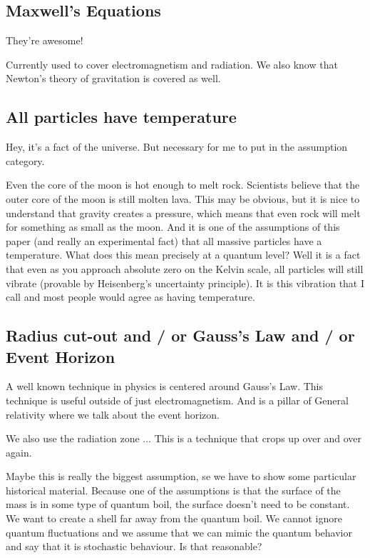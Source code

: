 \documentclass {article}
\begin{document}
\subsection{Maxwell’s Equations}

They’re awesome!

Currently used to cover electromagnetism and radiation. We also know that Newton's theory of gravitation is covered as well.


\subsection{All particles have temperature}

Hey, it’s a fact of the universe. But necessary for me to put in the assumption category. 

Even the core of the moon is hot enough to melt rock. Scientists believe that the outer core of the moon is still molten lava. This may be obvious, but it is nice to understand that gravity creates a pressure, which means that even rock will melt for something as small as the moon. And it is one of the assumptions of this paper (and really an experimental fact) that all massive particles have a temperature. What does this mean precisely at a quantum level? Well it is a fact that even as you approach absolute zero on the Kelvin scale, all particles will still vibrate (provable by Heisenberg’s uncertainty principle). It is this vibration that I call and most people would agree as having temperature.

\subsection{Radius cut-out and / or Gauss's Law and / or Event Horizon }

A well known technique in physics is centered around Gauss's Law. This technique is useful outside of just electromagnetism. And is a pillar of General relativity where we talk about the event horizon.

We also use the radiation zone ... This is a technique that crops up over and over again.

Maybe this is really the biggest assumption, se we have to show some particular historical material. Because one of the assumptions is that the surface of the mass is in some type of quantum boil, the surface doesn’t need to be constant. We want to create a shell far away from the quantum boil. We cannot ignore quantum fluctuations and we assume that we can mimic the quantum behavior and say that it is stochastic behaviour. Is that reasonable?
\end{document}
